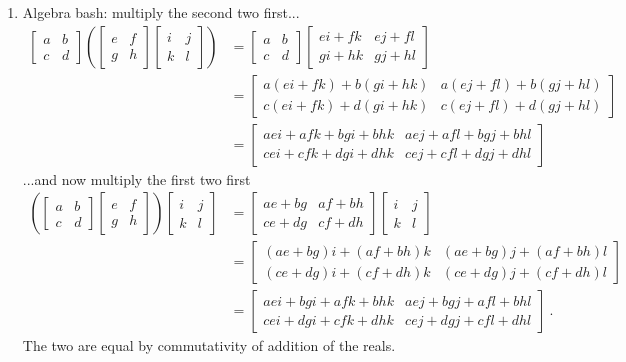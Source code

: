 \documentclass[]{article}
\begin{document}
\begin{enumerate}
\item Algebra bash: multiply the second two first...
\begin{align}
\begin{bmatrix}a&b\\c&d\end{bmatrix}\left(\begin{bmatrix}e&f\\g&h\end{bmatrix}\begin{bmatrix}i&j\\k&l\end{bmatrix}\right) &= \begin{bmatrix}a&b\\c&d\end{bmatrix}\begin{bmatrix}ei+fk&ej+fl\\gi+hk&gj+hl\end{bmatrix} \nonumber \\
&= \begin{bmatrix}a(ei+fk)+b(gi+hk)&a(ej+fl)+b(gj+hl)\\c(ei+fk)+d(gi+hk)&c(ej+fl)+d(gj+hl)\end{bmatrix} \nonumber \\
&= \begin{bmatrix}aei+afk+bgi+bhk&aej+afl+bgj+bhl\\cei+cfk+dgi+dhk&cej+cfl+dgj+dhl\end{bmatrix}
\end{align}
...and now multiply the first two first
\begin{align}
\left(\begin{bmatrix}a&b\\c&d\end{bmatrix}\begin{bmatrix}e&f\\g&h\end{bmatrix}\right)\begin{bmatrix}i&j\\k&l\end{bmatrix} &= \begin{bmatrix}ae+bg&af+bh\\ce+dg&cf+dh\end{bmatrix}\begin{bmatrix}i&j\\k&l\end{bmatrix} \nonumber \\
&= \begin{bmatrix}(ae+bg)i+(af+bh)k&(ae+bg)j+(af+bh)l\\(ce+dg)i+(cf+dh)k&(ce+dg)j+(cf+dh)l\end{bmatrix} \nonumber \\
&= \begin{bmatrix}aei+bgi+afk+bhk&aej+bgj+afl+bhl\\cei+dgi+cfk+dhk&cej+dgj+cfl+dhl\end{bmatrix}\ .
\end{align}
The two are equal by commutativity of addition of the reals.



\end{enumerate}
\end{document}
